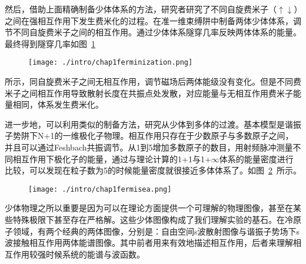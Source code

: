 然后，借助上面精确制备少体体系的方法，研究者研究了不同自旋费米子（$\uparrow\downarrow$）之间在强相互作用下发生费米化的过程\cite{zurn2012fermionization}。在准一维束缚阱中制备两体少体体系，调节不同自旋费米子之间的相互作用。通过少体体系隧穿几率反映两体体系的能量。最终得到隧穿几率如图~\ref{ferminization}~
\begin{figure}[!htbp]
    \centering
    \texttt{[image: ./intro/chap1ferminization.png]}
    \label{ferminization}
\end{figure}
所示，同自旋费米子之间无相互作用，调节磁场后两体能级没有变化。但是不同费米子之间相互作用导致散射长度在共振点处发散，对应能量与无相互作用费米子能量相同，体系发生费米化。

进一步地，可以利用类似的制备方法，研究从少体到多体的过渡\cite{WenzFermiSeaOnebyOne}。基本模型是谐振子势阱下N+1的一维极化子物理。相互作用只存在于少数原子与多数原子之间，并且可以通过Feshbach共振调节。从1到5增加多数原子的数目，用射频脉冲测量不同相互作用下极化子的能量，通过与理论计算的1+1与1+$\infty$体系的能量密度进行比较，可以发现在粒子数为5的时候能量密度就很接近多体体系了。如图~\ref{fermisea}~所示。
\begin{figure}[!htbp]
    \centering
    \texttt{[image: ./intro/chap1fermisea.png]}
    \label{fermisea}
\end{figure}

少体物理之所以重要是因为可以在理论方面提供一个可理解的物理图像，甚至在某些特殊极限下甚至存在严格解。这些少体图像构成了我们理解实验的基石。在冷原子领域，有两个经典的两体图像，分别是：自由空间s波散射图像与谐振子势场下s波接触相互作用两体能谱图像。其中前者用来有效地描述相互作用，后者来理解相互作用较强时候系统的能谱与波函数。

